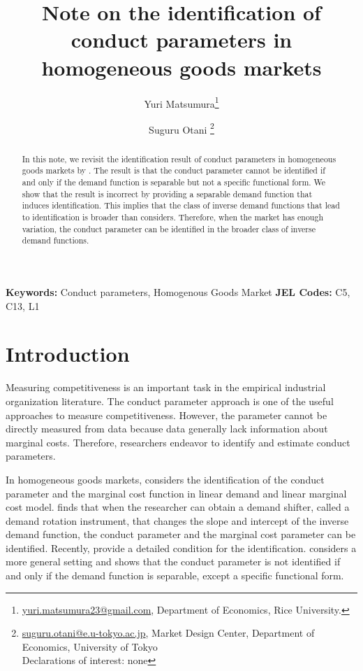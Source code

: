 \documentclass[11pt, a4paper]{article}
\title{Note on the identification of conduct parameters in homogeneous goods markets}
\author{Yuri Matsumura\thanks{\href{mailto:}{yuri.matsumura23@gmail.com}, Department of Economics, Rice University.} \and Suguru Otani \thanks{\href{mailto:}{suguru.otani@e.u-tokyo.ac.jp}, Market Design Center, Department of Economics, University of Tokyo
\\Declarations of interest: none %
}}
\theoremstyle{remark}
\begin{document}
\maketitle
\begin{abstract}
    In this note, we revisit the identification result of conduct parameters in homogeneous goods markets by \citet{lau1982identifying}.
    The result is that the conduct parameter cannot be identified if and only if the demand function is separable but not a specific functional form.
    We show that the result is incorrect by providing a separable demand function that induces identification.
    This implies that the class of inverse demand functions that lead to identification is broader than \citet{lau1982identifying} considers.
    Therefore, when the market has enough variation, the conduct parameter can be identified in the broader class of inverse demand functions.
\end{abstract}

\noindent\textbf{Keywords:} Conduct parameters, Homogenous Goods Market
\vspace{0in}
\newline
\noindent\textbf{JEL Codes:} C5, C13, L1

\bigskip





\section{Introduction}
Measuring competitiveness is an important task in the empirical industrial organization literature.
The conduct parameter approach is one of the useful approaches to measure competitiveness.
However, the parameter cannot be directly measured from data because data generally lack information about marginal costs.
Therefore, researchers endeavor to identify and estimate conduct parameters.

In homogeneous goods markets, \cite{bresnahan1982oligopoly} considers the identification of the conduct parameter and the marginal cost function in linear demand and linear marginal cost model.
\citet{bresnahan1982oligopoly} finds that when the researcher can obtain a demand shifter, called a demand rotation instrument, that changes the slope and intercept of the inverse demand function, the conduct parameter and the marginal cost parameter can be identified.
Recently, \citet{matsumura2023resolving} provide a detailed condition for the identification.
\citet{lau1982identifying} considers a more general setting and shows that the conduct parameter is not identified if and only if the demand function is separable, except a specific functional form.
\end{document}
